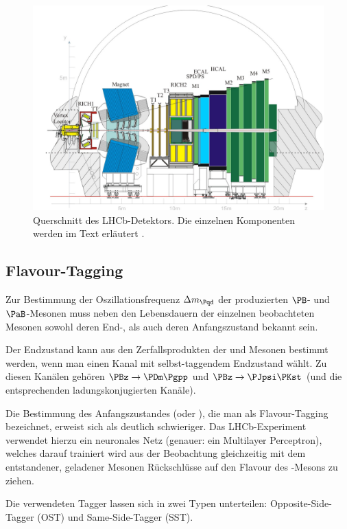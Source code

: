 \begin{figure}
  \includegraphics[width=\textwidth]{figures/lhcb.pdf}
  \caption{Querschnitt des LHCb-Detektors. Die einzelnen Komponenten werden im Text erläutert \cite{lhcb}.}
  \label{lhcb}
\end{figure}

\subsection{Flavour-Tagging}

Zur Bestimmung der Oszillationsfrequenz $\difference{m_{\Pqd}}$ der produzierten $\PB$- und $\PaB$-Mesonen muss neben den Lebensdauern der einzelnen beobachteten Mesonen sowohl deren End-, als auch deren Anfangszustand bekannt sein.

Der Endzustand kann aus den Zerfallsprodukten der \PBz und \PaBz Mesonen bestimmt werden, wenn man einen Kanal mit selbst-taggendem Endzustand wählt.
Zu diesen Kanälen gehören $\PBz \to \PDm \Pgpp$ und $\PBz \to \PJpsi \PKst$ (und die entsprechenden ladungskonjugierten Kanäle).

Die Bestimmung des Anfangszustandes (\PBz oder \PaBz), die man als Flavour-Tagging bezeichnet, erweist sich als deutlich schwieriger.
Das LHCb-Experiment verwendet hierzu ein neuronales Netz (genauer: ein Multilayer Perceptron), welches darauf trainiert wird aus der Beobachtung gleichzeitig mit dem \PBz entstandener, geladener Mesonen Rückschlüsse auf den Flavour des \PB-Mesons zu ziehen.

Die verwendeten Tagger lassen sich in zwei Typen unterteilen: Opposite-Side-Tagger (OST) und Same-Side-Tagger (SST).

